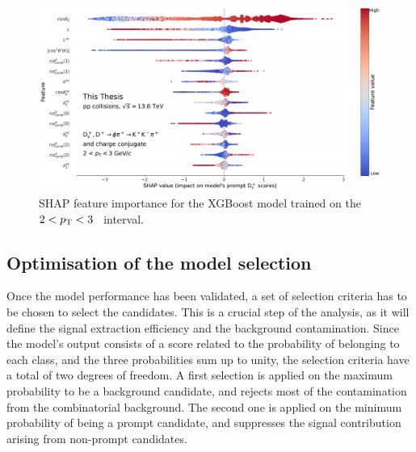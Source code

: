 \begin{figure}[htb]
    \centering
    \includegraphics[width=\textwidth]{Figures/Chapter 5/shap.pdf}
    \caption{SHAP feature importance for the XGBoost model trained on the \mbox{$2<p_\mathrm{T}<3$~\gevc} interval.}
    \label{fig:ml_feature_importance}
\end{figure}

\subsection{Optimisation of the model selection}
Once the model performance has been validated, a set of selection criteria has to be chosen to select the candidates. This is a crucial step of the analysis, as it will define the signal extraction efficiency and the background contamination. Since the model's output consists of a score related to the probability of belonging to each class, and the three probabilities sum up to unity, the selection criteria have a total of two degrees of freedom. A first selection is applied on the maximum probability to be a background candidate, and rejects most of the contamination from the combinatorial background. The second one is applied on the minimum probability of being a prompt \ds candidate, and suppresses the signal contribution arising from non-prompt \ds candidates. 

